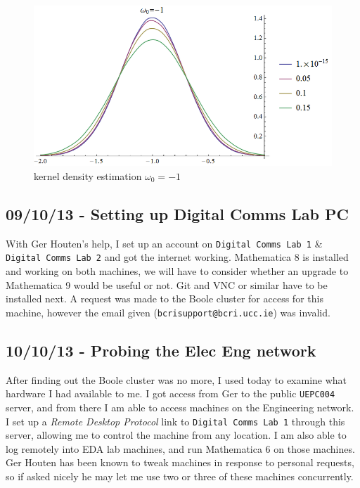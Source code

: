 \begin{figure}[htbp]
\centering
\includegraphics[width=\linewidth]{../../../plots/fyp1_w0_kde.png}
\caption{kernel density estimation $\omega_0=-1$}
\end{figure}

\subsection{09/10/13 - Setting up Digital Comms Lab PC}

With Ger Houten's help, I set up an account on \texttt{Digital Comms Lab 1} \&
\texttt{Digital Comms Lab 2} and got the internet working. Mathematica 8
is installed and working on both machines, we will have to consider
whether an upgrade to Mathematica 9 would be useful or not. Git and VNC
or similar have to be installed next. A request was made to the Boole
cluster for access for this machine, however the email given
(\texttt{bcrisupport@bcri.ucc.ie}) was invalid.

\subsection{10/10/13 - Probing the Elec Eng network}

After finding out the Boole cluster was no more, I used today to examine
what hardware I had available to me. I got access from Ger to the public
\texttt{UEPC004} server, and from there I am able to access machines on
the Engineering network. I set up a \emph{Remote Desktop Protocol} link to
\texttt{Digital Comms Lab 1} through this server, allowing me to control
the machine from any location. I am also able to log remotely into EDA
lab machines, and run Mathematica 6 on those machines. Ger Houten has been known to tweak machines in response to
personal requests, so if asked nicely he may let me use two or three of
these machines concurrently.

